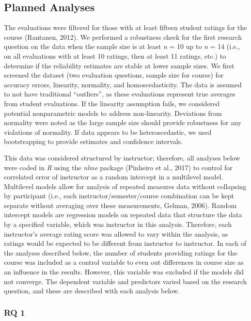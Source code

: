 \documentclass[
  man]{apa7}
\begin{document}
\hypertarget{planned-analyses}{%
\subsection{Planned Analyses}\label{planned-analyses}}

The evaluations were filtered for those with at least fifteen student
ratings for the course (Rantanen, 2012). We performed a robustness check
for the first research question on the data when the sample size is at
least \emph{n} = 10 up to \emph{n} = 14 (i.e., on all evaluations with at least 10
ratings, then at least 11 ratings, etc.) to determine if the reliability
estimates are stable at lower sample sizes. We first screened the
dataset (two evaluation questions, sample size for course) for accuracy
errors, linearity, normality, and homoscedasticity. The data is assumed
to not have traditional ``outliers'', as these evaluations represent true
averages from student evaluations. If the linearity assumption fails, we
considered potential nonparametric models to address non-linearity.
Deviations from normality were noted as the large sample size should
provide robustness for any violations of normality. If data appears to
be heteroscedastic, we used bootstrapping to provide estimates and
confidence intervals.

This data was considered structured by instructor; therefore, all
analyses below were coded in \emph{R} using the \emph{nlme} package
(Pinheiro et al., 2017) to control for correlated error of instructor as a
random intercept in a multilevel model. Multilevel models allow for
analysis of repeated measures data without collapsing by participant
(i.e., each instructor/semester/course combination can be kept separate
without averaging over these measurements, Gelman, 2006). Random
intercept models are regression models on repeated data that structure
the data by a specified variable, which was instructor in this analysis.
Therefore, each instructor's average rating score was allowed to vary
within the analysis, as ratings would be expected to be different from
instructor to instructor. In each of the analyses described below, the
number of students providing ratings for the course was included as a
control variable to even out differences in course size as an influence
in the results. However, this variable was excluded if the models did
not converge. The dependent variable and predictors varied based on the
research question, and these are described with each analysis below.

\hypertarget{rq-1}{%
\subsubsection{RQ 1}\label{rq-1}}
\end{document}
